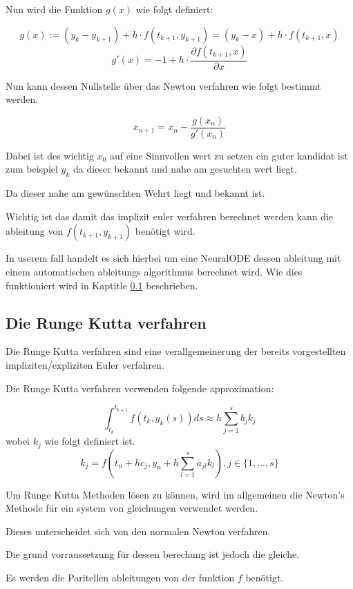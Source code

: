 Nun wird die Funktion $g(x)$ wie folgt definiert:

$$
g(x) := (y_k - y_{k + 1})  + h \cdot f(t_{k + 1}, y_{k + 1}) = (y_k - x)  + h \cdot f(t_{k + 1}, x)
$$
$$
g'(x) = -1 + h \cdot \frac{\partial f(t_{k+1}, x)}{\partial x}
$$

Nun kann dessen Nullstelle über das Newton verfahren wie folgt bestimmt werden.

$$
x_{n+1} = x_{n} - \frac{g(x_n)}{g'(x_n)}
$$

Dabei ist des wichtig $x_{0}$ auf eine Sinnvollen wert zu setzen ein guter kandidat ist zum beispiel
$y_{k}$ da dieser bekannt und nahe am gesuchten wert liegt.

Da dieser nahe am gewünschten Wehrt liegt und bekannt ist.

Wichtig ist das damit das implizit euler verfahren berechnet werden kann die ableitung von $f(t_{k + 1}, y_{k + 1})$ benötigt wird.

In userem fall handelt es sich hierbei um eine NeuralODE dessen ableitung mit einem automatischen ableitungs algorithmus berechnet wird. Wie dies funktioniert wird in Kaptitle \ref{} beschrieben.



\subsection{Die Runge Kutta verfahren}

Die Runge Kutta verfahren sind eine verallgemeinerung der
bereits vorgestellten impliziten/expliziten Euler verfahren.

Die Runge Kutta verfahren verwenden folgende approximation:

$$
\int_{t_k}^{t_{k+1}} f(t_k, y_k(s)) ds \approx h \sum_{j=1}^{s} b_j k_j
$$
wobei $k_j$ wie folgt definiert ist.
$$
k_j = f(t_n + h c_j, y_n + h \sum_{l=1}^{s}a_{jl}k_{l}) , j \in \{1, ..., s\}
$$


Um Runge Kutta Methoden lösen zu können, wird im allgemeinen die Newton's Methode für ein 
system von gleichungen verwendet werden.

Dieses unterscheidet sich von den normalen Newton verfahren.

Die grund vorraussetzung für dessen berechung ist jedoch die gleiche.

Es werden die Paritellen ableitungen von der funktion 
$f$ benötigt.


